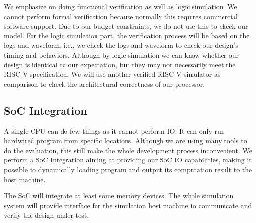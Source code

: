 We emphasize on doing functional verification as well as logic simulation. We cannot perform formal verification because normally this requires commercial software support. Due to our budget constraints, we do not use this to check our model. For the logic simulation part, the verification process will be based on the logs and waveform, i.e., we check the logs and waveform to check our design's timing and behaviors. Although by logic simulation we can know whether our design is identical to our expectation, but they may not necessarily meet the RISC-V specification. We will use another verified RISC-V simulator as comparison to check the architectural correctness of our processor.

\subsection{SoC Integration}
A single CPU can do few things as it cannot perform IO. It can only run hardwired program from specific locations. Although we are using many tools to do the evaluation, this still make the whole development process inconvenient. We perform a SoC Integration aiming at providing our SoC IO capabilities, making it possible to dynamically loading program and output its computation result to the host machine. 

The SoC will integrate at least some memory devices. The whole simulation system will provide interface for the simulation host machine to communicate and verify the design under test.
